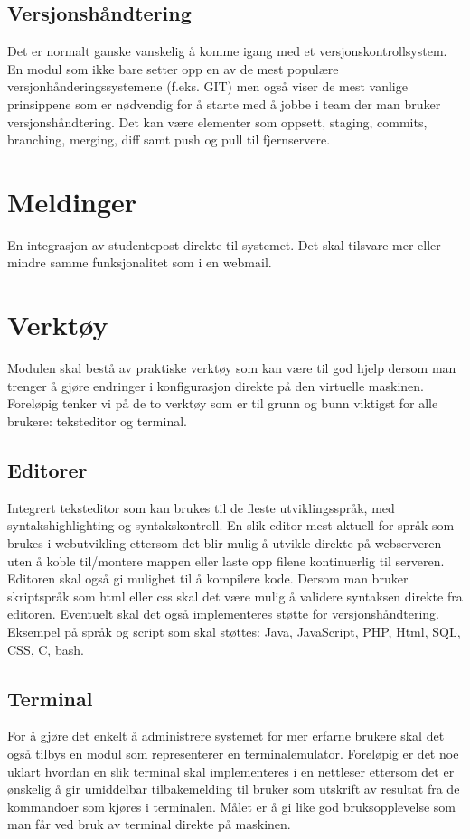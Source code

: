 \subsection{Versjonshåndtering}
Det er normalt ganske vanskelig å komme igang med et versjonskontrollsystem. En modul som ikke bare setter opp en av de mest populære versjonhånderingssystemene (f.eks. GIT) men også viser de mest vanlige prinsippene som er nødvendig for å starte med å jobbe i team der man bruker versjonshåndtering. Det kan være elementer som oppsett, staging, commits, branching, merging, diff samt push og pull til fjernservere. 



\section{Meldinger}
En integrasjon av studentepost direkte til systemet. Det skal tilsvare mer eller mindre samme funksjonalitet som i en webmail. 



\section{Verktøy}
Modulen skal bestå av praktiske verktøy som kan være til god hjelp dersom man trenger å gjøre endringer i konfigurasjon direkte på den virtuelle maskinen. Foreløpig tenker vi på de to verktøy som er til grunn og bunn viktigst for alle brukere: teksteditor og terminal.

\subsection{Editorer}
Integrert teksteditor som kan brukes til de fleste utviklingsspråk, med syntakshighlighting og syntakskontroll. En slik editor mest aktuell for språk som brukes i webutvikling ettersom det blir mulig å utvikle direkte på webserveren uten å koble til/montere mappen eller laste opp filene kontinuerlig til serveren. Editoren skal også gi mulighet til å kompilere kode. Dersom man bruker skriptspråk som html eller css skal det være mulig å validere syntaksen direkte fra editoren. Eventuelt skal det også implementeres støtte for versjonshåndtering. Eksempel på språk og script som skal støttes: Java, JavaScript, PHP, Html, SQL, CSS, C, bash.

\subsection{Terminal}
For å gjøre det enkelt å administrere systemet for mer erfarne brukere skal det også tilbys en modul som representerer en terminalemulator. Foreløpig er det noe uklart hvordan en slik terminal skal implementeres i en nettleser ettersom det er ønskelig å gir umiddelbar tilbakemelding til bruker som utskrift av resultat fra de kommandoer som kjøres i terminalen. Målet er å gi like god bruksopplevelse som man får ved bruk av terminal direkte på maskinen. 

